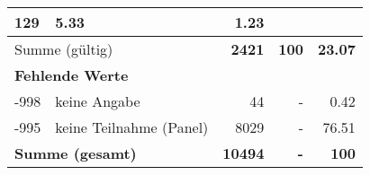 \begin{longtable}{lXrrr}
       \num{129} &
       \num[round-mode=places,round-precision=2]{5.33} &
         \num[round-mode=places,round-precision=2]{1.23} \\
     \midrule
     \multicolumn{2}{l}{Summe (gültig)} &
       \textbf{\num{2421}} &
     \textbf{\num{100}} &
       \textbf{\num[round-mode=places,round-precision=2]{23.07}} \\
     \multicolumn{5}{l}{\textbf{Fehlende Werte}}\\
       -998 &
       keine Angabe &
         \num{44} &
        - &
         \num[round-mode=places,round-precision=2]{0.42} \\
       -995 &
       keine Teilnahme (Panel) &
         \num{8029} &
        - &
         \num[round-mode=places,round-precision=2]{76.51} \\
     \midrule
     \multicolumn{2}{l}{\textbf{Summe (gesamt)}} &
          \textbf{\num{10494}} &
        \textbf{-} &
        \textbf{\num{100}} \\
     \bottomrule
     \end{longtable}
     
